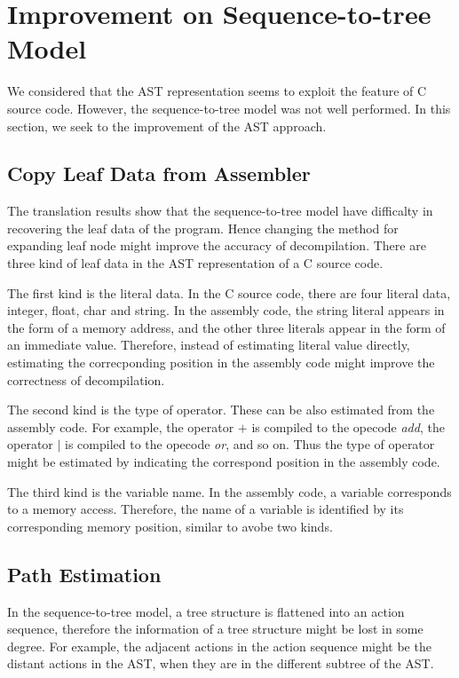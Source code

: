 \documentclass[senior,final,11pt]{iscs-thesis}
\begin{document}
\section{Improvement on Sequence-to-tree Model}
We considered that the AST representation seems to exploit the feature of C source code. 
However, the sequence-to-tree model was not well performed.
In this section, we seek to the improvement of the AST approach.
\subsection{Copy Leaf Data from Assembler}
The translation results show that the sequence-to-tree model have difficalty in recovering the leaf data of the program.
Hence changing the method for expanding leaf node might improve the accuracy of decompilation.
There are three kind of leaf data in the AST representation of a C source code.

The first kind is the literal data. In the C source code, there are four literal data, integer, float, char and string. 
In the assembly code, the string literal appears in the form of a memory address, and the other three literals appear in the form of an immediate value.
Therefore, instead of estimating literal value directly, estimating the correcponding position in the assembly code might improve the correctness of decompilation.

The second kind is the type of operator. These can be also estimated from the assembly code.
For example, the operator $ + $ is compiled to the opecode {\sl add}, the operator $ | $ is compiled to the opecode {\sl or}, and so on. 
Thus the type of operator might be estimated by indicating the correspond position in the assembly code.

The third kind is the variable name. In the assembly code, a variable corresponds to a memory access. 
Therefore, the name of a variable is identified by its corresponding memory position, similar to avobe two kinds.

\subsection{Path Estimation} 
In the sequence-to-tree model, a tree structure is flattened into an action sequence, 
therefore the information of a tree structure might be lost in some degree.
For example, the adjacent actions in the action sequence might be the distant actions in the AST, when they are in the different subtree of the AST.
\end{document}
